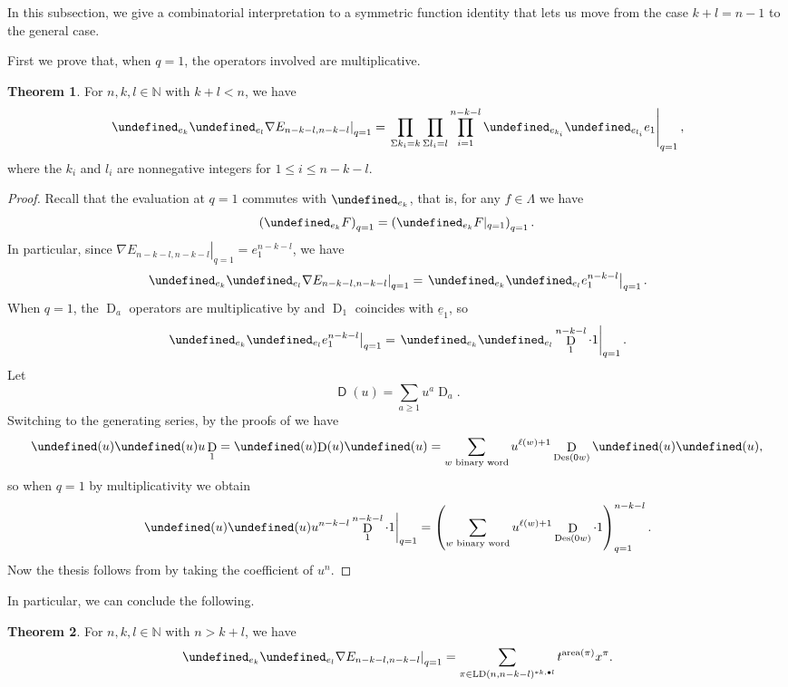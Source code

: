 \documentclass[reqno]{amsart}
\theoremstyle{plain}
\theoremstyle{definition}
\newtheorem{theorem}{Theorem}[section]
\theoremstyle{remark}
\DeclareMathOperator{\D}{D}
\DeclareMathOperator{\LD}{LD}
\DeclareMathOperator{\area}{area}
\DeclareMathOperator{\Des}{Des}
\let\oldTheta\Theta
\let\Theta\undefined
\DeclareMathOperator{\Theta}{\oldTheta}
\newcommand{\<}{\langle}
\renewcommand{\>}{\rangle}
\begin{document}
In this subsection, we give a combinatorial interpretation to a symmetric function identity that lets us move from the case $k+l=n-1$ to the general case.

First we prove that, when $q=1$, the operators involved are multiplicative. 

\begin{theorem}
    \label{thm:theta_q1_multiplicative}
    For $n,k,l \in \mathbb{N}$ with $k+l < n$, we have \[ \left. \Theta_{e_k} \Theta_{e_l} \nabla E_{n-k-l, n-k-l} \right|_{q=1} = \left. \prod_{\Sigma k_i = k} \prod_{\Sigma l_i = l} \prod_{i=1}^{n-k-l} \Theta_{e_{k_i}} \Theta_{e_{l_i}} e_1 \right|_{q=1}, \]
    where the $k_i$ and $l_i$ are nonnegative integers for $1 \leq i \leq n-k-l$.  
\end{theorem}

\begin{proof}
    Recall that the evaluation at $q=1$ commutes with $\Theta_{e_k}$, that is, for any $f \in \Lambda$ we have
    \[ \left( \Theta_{e_k} F \right)_{q=1} = \left( \Theta_{e_k} F \rvert_{{q=1}} \right)_{q=1}. \]
    In particular, since $ \left. \nabla E_{n-k-l, n-k-l} \right|_{q=1} = e_1^{n-k-l}$, we have
    \[ \left. \Theta_{e_k} \Theta_{e_l} \nabla E_{n-k-l, n-k-l} \right|_{q=1} = \left. \Theta_{e_k} \Theta_{e_l} e_1^{n-k-l} \right|_{q=1}. \]
    When $q=1$, the $\D_a$ operators are multiplicative by  and $\D_1$ coincides with $\underline{e}_1$, so
    \[ \left. \Theta_{e_k} \Theta_{e_l} e_1^{n-k-l} \right|_{q=1} = \left. \Theta_{e_k} \Theta_{e_l} \D_1^{n-k-l} \cdot 1\right|_{q=1}. \]
    Let \[ \mathsf{\D}(u) = \sum_{a \geq 1} u^a \D_a. \] Switching to the generating series, by the proofs of  we have 
    \[ \Theta(u) \Theta(u) u \D_1 = \Theta(u) \mathsf{\D}(u) \Theta(u) = \sum_{w \text{ binary word}} u^{\ell(w)+1} \D_{\Des(0w)} \Theta(u) \Theta(u), \]
    so when $q=1$ by multiplicativity we obtain
    \[ \left. \Theta(u) \Theta(u) u^{n-k-l} \D_1^{n-k-l} \cdot 1 \right\rvert_{q=1} = \left( \sum_{w \text{ binary word}} u^{\ell(w)+1} \D_{\Des(0w)} \cdot 1 \right)_{q=1}^{n-k-l}. \]
    Now the thesis follows from  by taking the coefficient of $u^n$.
\end{proof}

In particular, we can conclude the following.

\begin{theorem}
    \label{thm:theta_theta_Enn}
    For $n,k,l \in \mathbb{N}$ with $n > k+l$, we have
    \[ \left. \Theta_{e_k} \Theta_{e_l} \nabla E_{n-k-l, n-k-l} \right|_{q=1} = \sum_{\pi \in \LD(n, n-k-l)^{\ast k, \bullet l}} t^{\area(\pi)} x^\pi. \]
\end{theorem}
\end{document}
